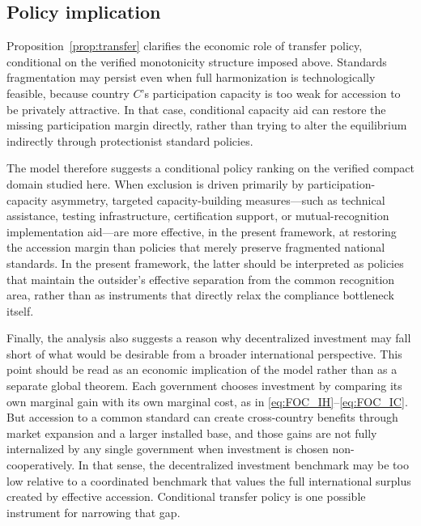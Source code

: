 \subsection{Policy implication}

Proposition~\ref{prop:transfer} clarifies the economic role of transfer policy,
conditional on the verified monotonicity structure imposed above. Standards
fragmentation may persist even when full harmonization is technologically
feasible, because country $C$'s participation capacity is too weak for
accession to be privately attractive. In that case, conditional capacity aid
can restore the missing participation margin directly, rather than trying to
alter the equilibrium indirectly through protectionist standard policies.

The model therefore suggests a conditional policy ranking on the verified
compact domain studied here. When exclusion is driven primarily by
participation-capacity asymmetry, targeted capacity-building measures---such as
technical assistance, testing infrastructure, certification support, or
mutual-recognition implementation aid---are more effective, in the present
framework, at restoring the accession margin than policies that merely
preserve fragmented national standards. In the present framework, the latter
should be interpreted as
policies that maintain the outsider's effective separation from the common
recognition area, rather than as instruments that directly relax the
compliance bottleneck itself.

Finally, the analysis also suggests a reason why decentralized investment may
fall short of what would be desirable from a broader international
perspective. This point should be read as an economic implication of the model
rather than as a separate global theorem. Each government chooses investment
by comparing its own marginal gain with its own marginal cost, as in
\eqref{eq:FOC_IH}--\eqref{eq:FOC_IC}. But accession to a common standard can
create cross-country benefits through market expansion and a larger installed
base, and those gains are not fully internalized by any single government
when investment is chosen non-cooperatively. In that sense, the decentralized
investment benchmark may be too low relative to a coordinated benchmark that
values the full international surplus created by effective accession.
Conditional transfer policy is one possible instrument for narrowing that gap.
